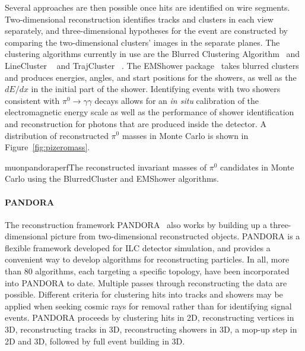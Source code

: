 Several approaches are then possible once hits are identified on wire
segments.  Two-dimensional reconstruction identifies tracks and
clusters in each view separately, and three-dimensional hypotheses for
the event are constructed by comparing the two-dimensional clusters'
images in the separate planes.  The clustering algorithms currently in
use are the Blurred Clustering Algorithm~\cite{blurredclustering} and
LineCluster ~\cite{linecluster} and TrajCluster ~\cite{trajcluster}.  The
EMShower package~\cite{emshowerpackage} takes blurred clusters and
produces energies, angles, and start positions for the showers, as
well as the $dE/dx$ in the initial part of the shower.  Identifying
events with two showers consistent with $\pi^0\rightarrow\gamma\gamma$
decays allows for an {\it in situ} calibration of the electromagnetic
energy scale as well as the performance of shower identification and
reconstruction for photons that are produced inside the detector.  A
distribution of reconstructed $\pi^0$ masses in Monte Carlo is shown
in Figure~\ref{fig:pizeromass}.

\begin{cdrfigure}{muonpandoraperf}{The reconstructed invariant masses of $\pi^0$ candidates in
  Monte Carlo using the BlurredCluster and EMShower algorithms.}
\end{cdrfigure}


\paragraph{PANDORA}
The reconstruction framework PANDORA~\cite{pandora} also works by
building up a three-dimensional picture from two-dimensional
reconstructed objects.  PANDORA is a flexible framework developed for
ILC detector simulation, and provides a convenient way to develop
algorithms for reconstructing particles.  In all, more than 80
algorithms, each targeting a specific topology, have been incorporated
into PANDORA to date.  Multiple passes through reconstructing the data
are possible.  Different criteria for clustering hits into tracks and
showers may be applied when seeking cosmic rays for removal rather than for
identifying signal events.  PANDORA proceeds by clustering hits in 2D,
reconstructing vertices in 3D, reconstructing tracks in 3D,
reconstructing showers in 3D, a mop-up step in 2D and 3D, followed by
full event building in 3D.

